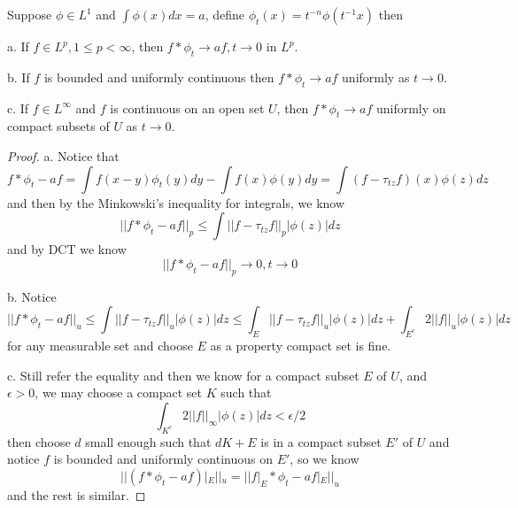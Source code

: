 \begin{theorem}
    Suppose $\phi\in L^1$ and $\int \phi(x)dx = a$, define $\phi_t(x) = t^{-n}\phi(t^{-1}x)$ then\par
    a. If $f\in L^p, 1\leq p < \infty$, then $f* \phi_t \to af,t\to 0$ in $L^p$.\par
    b. If $f$ is bounded and uniformly continuous then $f*\phi_t \to af$ uniformly as $t\to 0$.\par
    c. If $f\in L^{\infty}$ and $f$ is continuous on an open set $U$, then $f*\phi_t \to af$ uniformly on compact subsets of $U$ as $t\to 0$.
\end{theorem}
\begin{proof}\par
    a. Notice that
    \[
    f*\phi_t - af = \int f(x-y)\phi_t(y) dy- \int f(x)\phi(y)dy = \int(f-\tau_{tz}f)(x)\phi(z)dz
    \]
    and then by the Minkowski's inequality for integrals, we know
    \[
    ||f*\phi_t-af||_p \leq \int ||f-\tau_{tz}f||_p |\phi(z)| dz
    \]
    and by DCT we know
    \[
    ||f*\phi_t-af||_p \to 0, t\to 0
    \]\par
    b. Notice
    \[
    ||f*\phi_t - af||_u \leq \int ||f-\tau_{tz}f||_u|\phi(z)|dz \leq \int_E ||f-\tau_{tz}f||_u|\phi(z)|dz + \int_{E^c}2||f||_u|\phi(z)|dz
    \]
    for any measurable set and choose $E$ as a property compact set is fine.\par
    c. Still refer the equality and then we know for a compact subset $E$ of $U$, and $\epsilon >0$, we may choose a compact set $K$ such that
    \[
    \int_{K^c} 2||f||_{\infty}|\phi(z)|dz < \epsilon/2
    \]
    then choose $d$ small enough such that $dK+E$ is in a compact subset $E'$ of $U$ and notice $f$ is bounded and uniformly continuous on $E'$, so we know
    \[
    ||(f*\phi_t-af)|_{E}||_u = ||f|_E*\phi_t - af|_E||_u
    \]
    and the rest is similar.
\end{proof}

